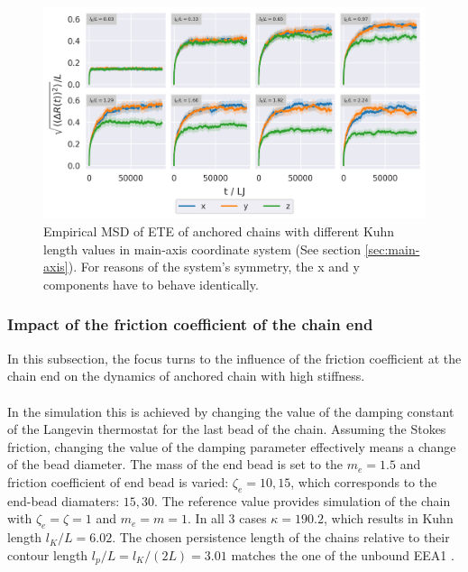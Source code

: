 \documentclass[
    paper=A4,pagesize=automedia,fontsize=12pt,
    BCOR=15mm,DIV=22,
    twoside,headinclude,footinclude=false,
    fleqn,             %
    bibliography=totocnumbered,          %
    listof=totoc,                %
    listof=flat,                 %
    cleardoublepage=empty      %
    numbers=endperiod
]{scrartcl}
\begin{document}
\begin{figure}
    \begin{center}
      \includegraphics[width=\columnwidth,trim={0cm 0cm 0cm 0.0cm},clip]{4-exp-msd_by_dim.png}
      \caption{\label{fig:msd_anchored_l_K_by_dim}
      Empirical MSD of ETE of anchored chains with different Kuhn length values in
      main-axis coordinate system (See section \ref{sec:main-axis}). For reasons of
      the system's symmetry, the x and y components have to behave identically.
      }
    \end{center}
\end{figure}

\FloatBarrier

\subsubsection{Impact of the friction coefficient of the chain end}
\label{sec:impact_of_zeta_e}
In this subsection, the focus turns to the influence 
of the friction coefficient at the chain end on the dynamics of anchored chain with high
stiffness.
\\
\\
In the simulation this is achieved by changing the value of the damping constant 
of the Langevin thermostat
for the last bead of the chain. Assuming the Stokes friction, 
changing the value of the damping parameter effectively means a change of the 
bead diameter. The mass of the end bead is set to the $m_e = 1.5$ 
and friction coefficient of end bead
is varied: $\zeta_e = 10, 15$, which corresponds to the end-bead diamaters: $15, 30$.
The reference value provides simulation of the chain with $\zeta_e=\zeta=1$ and $m_e=m=1$.
In all 3 cases $\kappa=190.2$, which results in Kuhn length $l_K/L=6.02$. The chosen
persistence length of the chains relative to their contour length $l_p/L=l_K/(2L)=3.01$ matches
the one of the unbound EEA1 \cite{Singh:2022}.
\end{document}

